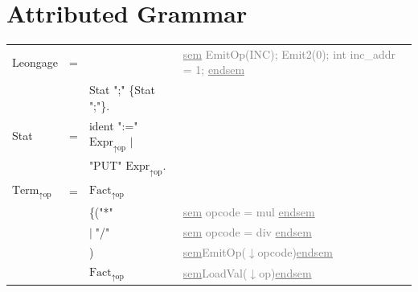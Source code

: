 \documentclass[11pt]{report}
\newcommand{\alternative}{$\mid \;$}
\newenvironment{atg}[1][6cm]
	{\begin{tabular}[b]{lclp{#1}}}
	{\end{tabular}}
\newcommand{\atgsy}[2]{$\textrm{#1}_\textrm{#2}$}
\newcommand{\outattr}{$\uparrow$}
\newcommand{\inattr}{$\downarrow$}
\newcommand{\semantics}[1]{\textcolor{Gray}{#1}}
\newenvironment {sem}
	{\underline{sem}}
	{\underline{endsem}}
\begin{document}
\chapter{Attributed Grammar}
\begin{atg}[4.5cm]
Leongage &=& & \semantics{\begin{sem} \newline EmitOp(INC); \newline Emit2(0); \newline int inc\_addr = 1; \newline \end{sem}}\\
&&Stat ";" \{Stat ";"\}. \\

Stat & = & ident ":=" \atgsy{Expr}{\outattr op}  \alternative \\
&& "PUT" \atgsy{Expr}{\outattr op}. \\

\atgsy{Term}{\outattr op} &=& \atgsy{Fact}{\outattr op}  \\
&& \{("*" &\semantics{\begin{sem} opcode = mul \end{sem}}\\
&& \alternative "/" & \semantics{\begin{sem} opcode = div \end{sem}}\\
&&) & \semantics{\begin{sem}EmitOp(\inattr opcode)\end{sem}}\\
&&\atgsy{Fact}{\outattr op} & \semantics{\begin{sem}LoadVal(\inattr op)\end{sem}}
\end{atg}

{}

\end{document}
